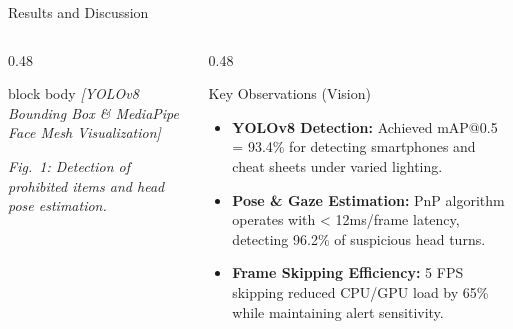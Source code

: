 \documentclass[aspectratio=169, 10pt]{beamer}
\begin{document}
\begin{frame}{Results and Discussion}
  \begin{columns}[T]
    \begin{column}{0.48\textwidth}
      \begin{beamercolorbox}[wd=\textwidth, rounded=true, sep=5pt,
            center]{block body}
        \vspace{1.8cm}
        \textit{\small [YOLOv8 Bounding Box \& MediaPipe Face Mesh Visualization]}
        \vspace{1.8cm}
      \end{beamercolorbox}
      \vspace{0.3em}
      {\footnotesize\textit{Fig.~1: Detection of prohibited items and head pose estimation.}}
    \end{column}
    \begin{column}{0.48\textwidth}
      \begin{block}{\textcolor{MLIOTwhite}{Key Observations (Vision)}}
        \begin{itemize}
          \item \textbf{YOLOv8 Detection:} Achieved mAP@0.5 = 93.4\% for detecting smartphones and cheat sheets under varied lighting.
          \item \textbf{Pose \& Gaze Estimation:} PnP algorithm operates with < 12ms/frame latency, detecting 96.2\% of suspicious head turns.
          \item \textbf{Frame Skipping Efficiency:} 5 FPS skipping reduced CPU/GPU load by 65\% while maintaining alert sensitivity.
        \end{itemize}
      \end{block}
    \end{column}
  \end{columns}
\end{frame}
\end{document}
